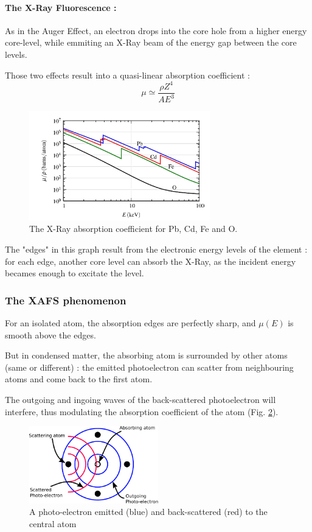 \documentclass[11pt,a4paper,oneside]{article}
\begin{document}
\paragraph{The X-Ray Fluorescence :} As in the Auger Effect, an electron drops into the core hole from a higher energy core-level, while emmiting an X-Ray beam of the energy gap between the core levels.

Those two effects result into a quasi-linear absorption coefficient :
\[\mu \simeq \frac{\rho Z^4}{A E^3}\]
\begin{figure}[h]
    \begin{center}
        \includegraphics[width=0.7\textwidth]{Images/AbsorptionCoeff}
        \caption{The X-Ray absorption coefficient for Pb, Cd, Fe and O.}
        \label{absorptionCoeff}
    \end{center}
\end{figure}

The "edges" in this graph result from the electronic energy levels of the element : for each edge, another core level can absorb the X-Ray, as the incident energy becames enough to excitate the level.

\newpage
\subsubsection{The XAFS phenomenon}
For an isolated atom, the absorption edges are perfectly sharp, and $\mu(E)$ is smooth above the edges.

But in condensed matter, the absorbing atom is surrounded by other atoms (same or different) : the emitted photoelectron can scatter from neighbouring atoms and come back to the first atom.

The outgoing and ingoing waves of the back-scattered photoelectron will interfere, thus modulating the absorption coefficient of the atom (Fig. \ref{scatteringschema}).
\begin{figure}[h]
    \begin{center}
        \includegraphics[width=0.5\textwidth]{Images/Scattering}
        \caption{A photo-electron emitted (blue) and back-scattered (red) to the central atom}
        \label{scatteringschema}
    \end{center}
\end{figure}
\end{document}
